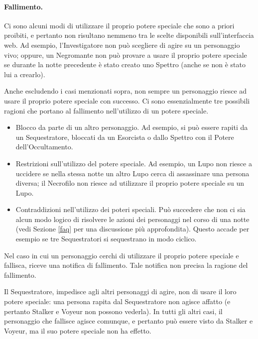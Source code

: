 \documentclass[a4paper,10pt]{article}
\begin{document}
\paragraph{Fallimento.} Ci sono alcuni modi di utilizzare il proprio potere speciale che sono a priori proibiti, e pertanto non risultano nemmeno tra le scelte disponibili sull'interfaccia web. Ad esempio, l'Investigatore non può scegliere di agire su un personaggio vivo; oppure, un Negromante non può provare a usare il proprio potere speciale se durante la notte precedente è stato creato uno Spettro (anche se non è stato lui a crearlo).

Anche escludendo i casi menzionati sopra, non sempre un personaggio riesce ad usare il proprio potere speciale con successo.
Ci sono essenzialmente tre possibili ragioni che portano al fallimento nell'utilizzo di un potere speciale.
\begin{itemize}
 \item Blocco da parte di un altro personaggio. Ad esempio, si può essere rapiti da un Sequestratore, bloccati da un Esorcista o dallo Spettro con il Potere dell'Occultamento.
 \item Restrizioni sull'utilizzo del potere speciale. Ad esempio, un Lupo non riesce a uccidere se nella stessa notte un altro Lupo cerca di assassinare una persona diversa; il Necrofilo non riesce ad utilizzare il proprio potere speciale su un Lupo.
 \item Contraddizioni nell'utilizzo dei poteri speciali. Può succedere che non ci sia alcun modo logico di risolvere le azioni dei personaggi nel corso di una notte (vedi Sezione \ref{faq} per una discussione più approfondita). Questo accade per esempio se tre Sequestratori si sequestrano in modo ciclico.
\end{itemize}

Nel caso in cui un personaggio cerchi di utilizzare il proprio potere speciale e fallisca, riceve una notifica di fallimento. Tale notifica non precisa la ragione del fallimento.

Il Sequestratore, impedisce agli altri personaggi di agire, non di usare il loro potere speciale: una persona rapita dal Sequestratore non agisce affatto (e pertanto Stalker e Voyeur non possono vederla).
In tutti gli altri casi, il personaggio che fallisce agisce comunque, e pertanto può essere visto da Stalker e Voyeur, ma il suo potere speciale non ha effetto. 
\end{document}

